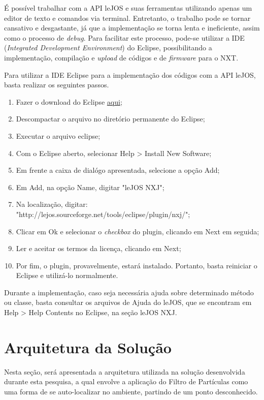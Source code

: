 	É possível trabalhar com a API leJOS e suas ferramentas utilizando apenas um editor de texto e comandos via terminal. Entretanto, o trabalho pode se tornar cansativo e
	desgastante, já que a implementação se torna lenta e ineficiente, assim como o processo de \textit{debug}. Para facilitar este processo, pode-se utilizar
	a IDE (\textit{Integrated Development Environment}) do Eclipse, possibilitando a implementação, compilação e \textit{upload} de códigos e de \textit{firmware} para o NXT.

	Para utilizar a IDE Eclipse para a implementação dos códigos com a API leJOS, basta realizar os seguintes passos.

	\begin{enumerate}
		\item Fazer o download do Eclipse \href{www.eclipse.org}{aqui};
		\item Descompactar o arquivo no diretório permanente do Eclipse;
		\item Executar o arquivo eclipse;
		\item Com o Eclipse aberto, selecionar Help > Install New Software;
		\item Em frente a caixa de dialógo apresentada, selecione a opção Add;
		\item Em Add, na opção Name, digitar "leJOS NXJ";
		\item Na localização, digitar: "http://lejos.sourceforge.net/tools/eclipse/plugin/nxj/";
		\item Clicar em Ok e selecionar o \textit{checkbox} do plugin, clicando em Next em seguida;
		\item Ler e aceitar os termos da licença, clicando em Next;
		\item Por fim, o plugin, provavelmente, estará instalado. Portanto, basta reiniciar o Eclipse e utilizá-lo normalmente.
	\end{enumerate}

	Durante a implementação, caso seja necessária ajuda sobre determinado método ou classe, basta consultar os arquivos de Ajuda do leJOS, que se encontram em
	Help > Help Contents no Eclipse, na seção leJOS NXJ.

\section{Arquitetura da Solução}

	Nesta seção, será apresentada a arquitetura utilizada na solução desenvolvida durante esta pesquisa, a qual envolve a aplicação do Filtro
	de Partículas como uma forma de se auto-localizar no ambiente, partindo de um ponto desconhecido.

